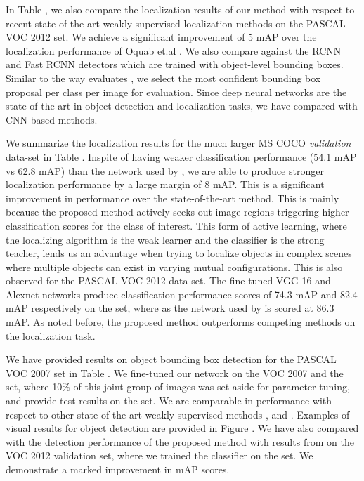 \documentclass[runningheads]{llncs}
\begin{document}
In Table , we also compare the localization results of our method with respect to recent state-of-the-art weakly supervised localization methods on the PASCAL VOC 2012  set. We achieve a significant improvement of 5 mAP over the  localization performance of Oquab et.al \cite{oquabobject}. We also compare against the RCNN \cite{girshick2014rich} and Fast RCNN \cite{girshickICCV15fastrcnn} detectors which are trained with object-level bounding boxes. Similar to the way \cite{oquabobject} evaluates \cite{girshick2014rich}, we select the most confident bounding box proposal per class per image for evaluation. Since deep neural networks are the state-of-the-art in object detection and localization tasks, we have compared with CNN-based methods.

We summarize the localization results for the much larger MS COCO \textit{validation} data-set in Table . Inspite of having weaker classification performance (54.1 mAP vs 62.8 mAP) than the network used by \cite{oquabobject}, we are able to produce stronger localization performance by a large margin of 8 mAP. This is a significant improvement in performance over the state-of-the-art method. This is mainly because the proposed method actively seeks out image regions triggering higher classification scores for the class of interest. This form of active learning, where the localizing algorithm is the weak learner and the classifier is the strong teacher, lends us an advantage when trying to localize objects in complex scenes where multiple objects can exist in varying mutual configurations. This is also observed for the PASCAL VOC 2012 data-set. The fine-tuned VGG-16 and Alexnet networks produce classification performance scores of  74.3 mAP and 82.4 mAP respectively on the  set, where as the network used by \cite{oquabobject} is scored at 86.3 mAP. As noted before, the proposed method outperforms competing methods on the localization task.

We have provided results on object bounding box detection for the PASCAL VOC 2007  set in Table . We fine-tuned our network on the VOC 2007  and the  set, where 10\% of this joint group of images was set aside for parameter tuning, and provide test results on the  set. We are comparable in performance with respect to other state-of-the-art weakly supervised methods \cite{cinbis2014multi}, \cite{bilen2015weakly} and \cite{wang2014weakly}.  Examples of visual results for object detection are provided in Figure . We have also compared with the detection performance of the proposed method with results from \cite{oquabobject} on the VOC 2012 validation set, where we trained the classifier on the  set. We demonstrate a marked improvement in mAP scores.
\end{document}
